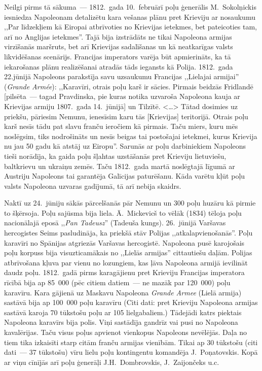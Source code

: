 \documentclass[twoside,a5paper,12pt,fleqn,openany]{extbook}
\newcommand{\pltxti}[1]{\textit{\textpolish{#1}}}
\newcommand{\frtxti}[1]{\textit{\textfrench{#1}}}
\newcommand{\citespace}{<\dots{}>}
\begin{document}
Neilgi pirms tā sākuma~--- 1812.~gada 10.~februārī poļu ģenerālis M.~Sokolņickis iesniedza Napoleonam detalizētu kara vešanas plānu pret Krieviju ar nosaukumu ,,Par līdzekļiem kā Eiropai atbrīvoties no Krievijas ietekmes, bet pateicoties tam, arī no Anglijas ietekmes''. Tajā bija izstrādāts ne tikai Napoleona armijas virzīšanās maršruts, bet arī Krievijas sadalīšanas un kā neatkarīgas valsts likvidēšanas scenārijs. Francijas imperators varēja būt apmierināts, ka tā iekarošanas plānu realizēšanai atradās tāds iegansts kā Polija. 1812.~gada 22.jūnijā Napoleons parakstīja savu uzsaukumu Francijas ,,Lielajai armijai'' (\frtxti{Grande Armée}): ,,Karavīri, otrais poļu karš ir sācies. Pirmais beidzās Fridlandē [pilsēta~--- tagad Pravdinska, pie kuras notika uzvaroša Napoleona kauja ar Krievijas armiju 1807.~gada 14.~jūnijā] un Tilzītē. \citespace{} Tātad dosimies uz priekšu, pāriesim Nemunu, ienesīsim karu tās [Krievijas] teritorijā. Otrais poļu karš nesīs tādu pat slavu franču ieročiem kā pirmais. Taču miers, kuru mēs noslēgsim, tiks nodrošināts un nesīs beigas tai postošajai ietekmei, kurus Krievija nu jau 50 gadu kā atstāj uz Eiropu''. Sarunās ar poļu darbiniekiem Napoleons tieši norādīja, ka gaida poļu šļahtas uzstāšanās pret Krieviju lietuviešu, baltkrievu un ukraiņu zemēs. Taču 1812.~gada martā noslēgtajā līgumā ar Austriju Napoleons tai garantēja Galīcijas paturēšanu. Kāda varētu kļūt poļu valsts Napoleona uzvaras gadījumā, tā arī nebija skaidrs.

Naktī uz 24.~jūniju sākās pārcelšanās pār Nemunu un 300 poļu huzāru kā pirmie to šķērsoja. Poļu sajūsma bija liela. Ā.~Mickevicš to vēlāk (1834) tēloja poļu nacionālajā eposā ,,\pltxti{Pan Tadeusz}'' (Tadeuša kungs). 26.~jūnijā Varšavas hercogistes Seims pasludināja, ka priekšā stāv Polijas ,,atkalapvienošanās''. Poļu karavīri no Spānijas atgriezās Varšavas hercogistē. Napoleona pusē karojošais poļu korpuss bija visuzticamākais no ,,Lielās armijas'' cittautiešu daļām. Polijas atbrīvošana kļuva par vienu no lozungiem, kas ļāva Napoleona armijā ievilināt daudz poļu. 1812.~gadā pirms karagājienu pret Krieviju Francijas imperatora rīcībā bija ap 85~000 (pēc citiem datiem~--- ne mazāk par 120~000) poļu karavīru. Kara gājienā uz Maskavu Napoleona \frtxti{Grande Armee} (Lielā armija) sastāvā bija ap 100~000 poļu karavīru (Citi dati: pret Krieviju Napoleona armijas sastāvā karoja 70 tūkstošu poļu ar 105 lielgabaliem.) Tādejādi katrs piektais Napoleona karavīrs bija polis. Viņi sastādīja gandrīz vai pusi no Napoleona kavalērijas. Taču visus poļus apvienot vienkopus Napoleons nevēlējās. Daļa no tiem tika izkaisīti starp citām franču armijas vienībām. Tikai ap 30 tūkstošu (citi dati~--- 37 tūkstošu) vīru lielu poļu kontingentu komandēja J.~Poņatovskis. Kopā ar viņu cīnījās arī poļu ģenerāļi J.H.~Dombrovskis, J.~Zaijončeks u.c.
\end{document}
